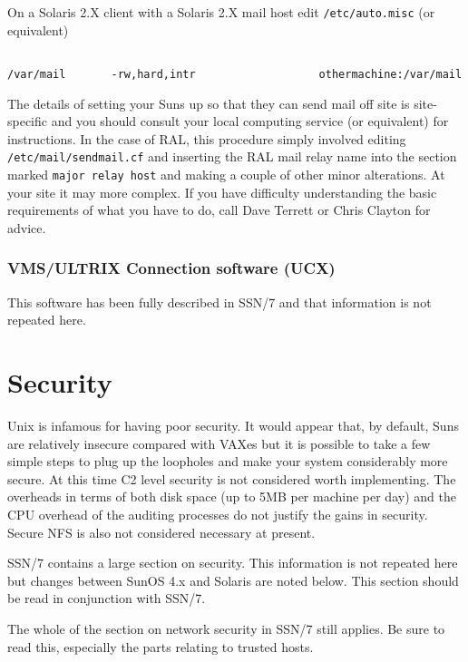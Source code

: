 On a Solaris 2.X client with a Solaris 2.X mail host edit {\tt /etc/auto.misc} (or 
equivalent)
\begin{verbatim}

/var/mail       -rw,hard,intr                   othermachine:/var/mail

\end{verbatim}


The details of setting your Suns up so that they can send mail off site 
is site-specific and you should consult your local computing service
(or equivalent) for instructions. In the case of RAL, this procedure
simply involved editing \verb+/etc/mail/sendmail.cf+ and inserting
the RAL mail relay name into the section marked \verb+major relay host+
and making a couple of other minor alterations. 
At your site it may more complex. If you have difficulty understanding
the basic requirements of what you have to do, call Dave Terrett 
or Chris Clayton for advice.


\subsubsection{VMS/ULTRIX Connection software (UCX)}

This software has been fully described in SSN/7 and that information is not
repeated here. 


\section{Security}

Unix is infamous for having poor security. It would appear that, by
default, Suns are relatively insecure compared with VAXes but it is possible to 
take a few simple steps to plug up the loopholes and make your system
considerably more secure. At this time C2 level security is not considered
worth implementing. The overheads in terms of both disk space (up to 5MB per
machine per day) and the CPU overhead of the auditing processes do not justify
the gains in security. Secure NFS is also not considered necessary at present.

SSN/7 contains a large section on security. This information is not repeated
here but changes between SunOS 4.x and Solaris are noted below. This section
should be read in conjunction with SSN/7.

The whole of the section on network security in SSN/7 still applies. 
Be sure to read this, especially the parts relating to trusted hosts. 



